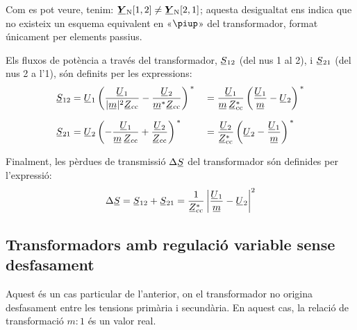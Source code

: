 Com es pot veure, tenim: $\mcmplx{Y}\ped{N}[1,2] \neq
\mcmplx{Y}\ped{N}[2,1]$; aquesta desigualtat ens indica que no existeix un esquema
equivalent en «$\piup$» del transformador, format únicament per
elements passius.

Els fluxos de potència a través del transformador, $\cmplx{S}_{12}$
(del nus 1 al 2), i $\cmplx{S}_{21}$ (del nus 2 a l'1), són definits
per les expressions: 
\begin{alignat}{2}
   \cmplx{S}_{12} &= \cmplx{U}_1 \left( \frac{\cmplx{U}_1}{|\cmplx{m}|^2 \cmplx{Z}\ped{cc}} - \frac{\cmplx{U}_2}{\cmplx{m}^* \cmplx{Z}\ped{cc}} \right)^{\,*} &&= \frac{\cmplx{U}_1}{\cmplx{m}\, \cmplx{Z}\ped{cc}^*} \left( \frac{\cmplx{U}_1}{\cmplx{m}} - \cmplx{U}_2 \right)^{\,*} \label{eq:s12_trafo_reg_decal} \\[1.5ex]
   \cmplx{S}_{21} &= \cmplx{U}_2 \left( - \frac{\cmplx{U}_1}{\cmplx{m} \,\cmplx{Z}\ped{cc}} + \frac{\cmplx{U}_2} {\cmplx{Z}\ped{cc}} \right)^{\,*} &&= \frac{\cmplx{U}_2}{\cmplx{Z}\ped{cc}^*} \left(  \cmplx{U}_2 - \frac{\cmplx{U}_1}{\cmplx{m}}  \right)^{\,*} \label{eq:s21_trafo_reg_decal}
\end{alignat}

Finalment, les pèrdues de transmissió $\Delta\cmplx{S}$ del transformador són definides per l'expressió:
\begin{equation} \label{eq:ds_trafo_reg_decal}
   \Delta\cmplx{S} = \cmplx{S}_{12} + \cmplx{S}_{21} = \frac{1}{\cmplx{Z}\ped{cc}^*}  \left|
    \frac{\cmplx{U}_1}{\cmplx{m}} - \cmplx{U}_2 \right|^2
\end{equation}


\subsection{Transformadors amb regulació variable sense desfasament} \label{sec:trafo_reg}

Aquest és un cas particular de l'anterior, on el transformador no
origina desfasament entre les tensions primària i secundària.
En aquest cas, la relació de transformació $m\!:\!1$ és un valor real.

